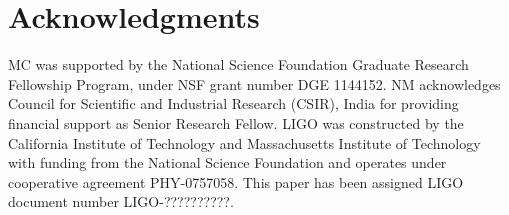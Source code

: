 \documentclass[reprint, prl, aps, showpacs]{revtex4-1}
\begin{document}
\section{Acknowledgments}
MC was supported by the National Science Foundation Graduate Research Fellowship
Program, under NSF grant number DGE 1144152. 
NM acknowledges Council for Scientific and Industrial Research (CSIR), India for providing financial support as Senior Research Fellow.  
LIGO was constructed by the California Institute of Technology and Massachusetts Institute of Technology with funding from the National Science Foundation and operates under cooperative agreement PHY-0757058.
This paper has been assigned LIGO document number LIGO-??????????.



\end{document}
